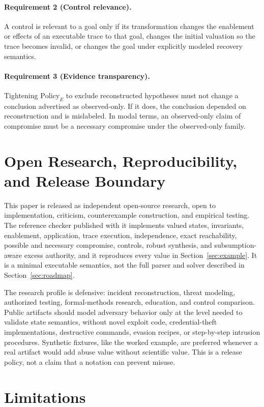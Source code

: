 \documentclass[11pt,letterpaper]{article}
\theoremstyle{definition}
\begin{document}
\paragraph{Requirement 2 (Control relevance).} A control is relevant to a goal only if its transformation changes the enablement or effects of an executable trace to that goal, changes the initial valuation so the trace becomes invalid, or changes the goal under explicitly modeled recovery semantics.

\paragraph{Requirement 3 (Evidence transparency).} Tightening $\mathrm{Policy}_E$ to exclude reconstructed hypotheses must not change a conclusion advertised as observed-only. If it does, the conclusion depended on reconstruction and is mislabeled. In modal terms, an observed-only claim of compromise must be a necessary compromise under the observed-only family.

\section{Open Research, Reproducibility, and Release Boundary}

This paper is released as independent open-source research, open to implementation, criticism, counterexample construction, and empirical testing. The reference checker published with it implements valued states, invariants, enablement, application, trace execution, independence, exact reachability, possible and necessary compromise, controls, robust synthesis, and subsumption-aware excess authority, and it reproduces every value in Section~\ref{sec:example}. It is a minimal executable semantics, not the full parser and solver described in Section~\ref{sec:roadmap}.

The research profile is defensive: incident reconstruction, threat modeling, authorized testing, formal-methods research, education, and control comparison. Public artifacts should model adversary behavior only at the level needed to validate state semantics, without novel exploit code, credential-theft implementations, destructive commands, evasion recipes, or step-by-step intrusion procedures. Synthetic fixtures, like the worked example, are preferred whenever a real artifact would add abuse value without scientific value. This is a release policy, not a claim that a notation can prevent misuse.

\section{Limitations}
\end{document}
